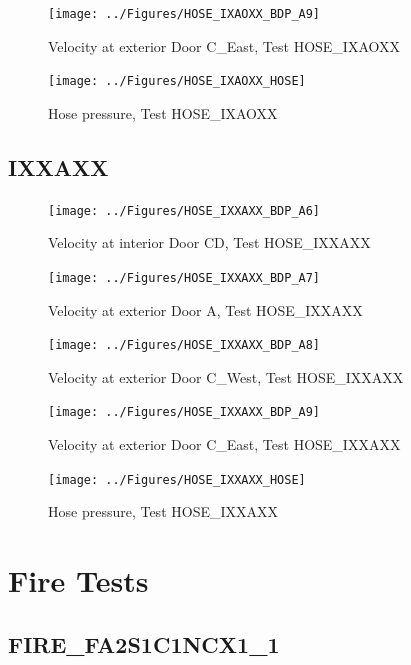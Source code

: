 \documentclass[11pt,oneside]{book}
\begin{document}
\begin{figure}[!ht]
\texttt{[image: ../Figures/HOSE\_IXAOXX\_BDP\_A9]}
\caption{Velocity at exterior Door C\_East, Test HOSE\_IXAOXX}
\label{fig:HOSE_IXAOXX_BDP_A9}
\end{figure}

\begin{figure}[!ht]
\texttt{[image: ../Figures/HOSE\_IXAOXX\_HOSE]}
\caption{Hose pressure, Test HOSE\_IXAOXX}
\label{fig:HOSE_IXAOXX_HOSE}
\end{figure}


\clearpage


\subsection{IXXAXX}

\begin{figure}[!ht]
\texttt{[image: ../Figures/HOSE\_IXXAXX\_BDP\_A6]}
\caption{Velocity at interior Door CD, Test HOSE\_IXXAXX}
\label{fig:HOSE_IXXAXX_BDP_A6}
\end{figure}

\begin{figure}[!ht]
\texttt{[image: ../Figures/HOSE\_IXXAXX\_BDP\_A7]}
\caption{Velocity at exterior Door A, Test HOSE\_IXXAXX}
\label{fig:HOSE_IXXAXX_BDP_A7}
\end{figure}

\begin{figure}[!ht]
\texttt{[image: ../Figures/HOSE\_IXXAXX\_BDP\_A8]}
\caption{Velocity at exterior Door C\_West, Test HOSE\_IXXAXX}
\label{fig:HOSE_IXXAXX_BDP_A8}
\end{figure}

\begin{figure}[!ht]
\texttt{[image: ../Figures/HOSE\_IXXAXX\_BDP\_A9]}
\caption{Velocity at exterior Door C\_East, Test HOSE\_IXXAXX}
\label{fig:HOSE_IXXAXX_BDP_A9}
\end{figure}

\begin{figure}[!ht]
\texttt{[image: ../Figures/HOSE\_IXXAXX\_HOSE]}
\caption{Hose pressure, Test HOSE\_IXXAXX}
\label{fig:HOSE_IXXAXX_HOSE}
\end{figure}


\clearpage


\section{Fire Tests}

\subsection{FIRE\_FA2S1C1NCX1\_1}
\end{document}

